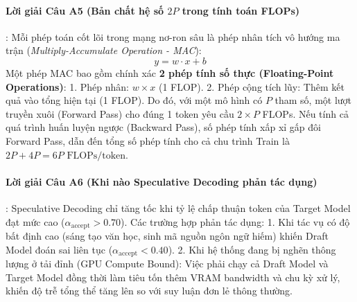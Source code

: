 \paragraph{Lời giải Câu A5 (Bản chất hệ số $2P$ trong tính toán FLOPs)}:
Mỗi phép toán cốt lõi trong mạng nơ-ron sâu là phép nhân tích vô hướng ma trận (\textit{Multiply-Accumulate Operation - MAC}):
\begin{equation*}
y = w \cdot x + b
\end{equation*}
Một phép MAC bao gồm chính xác \textbf{2 phép tính số thực (Floating-Point Operations)}:
1. Phép nhân: $w \times x$ (1 FLOP).
2. Phép cộng tích lũy: Thêm kết quả vào tổng hiện tại (1 FLOP).
Do đó, với một mô hình có $P$ tham số, một lượt truyền xuôi (Forward Pass) cho đúng 1 token yêu cầu $2 \times P$ FLOPs. Nếu tính cả quá trình huấn luyện ngược (Backward Pass), số phép tính xấp xỉ gấp đôi Forward Pass, dẫn đến tổng số phép tính cho cả chu trình Train là $2P + 4P = 6P\text{ FLOPs/token}$.

\paragraph{Lời giải Câu A6 (Khi nào Speculative Decoding phản tác dụng)}:
Speculative Decoding chỉ tăng tốc khi tỷ lệ chấp thuận token của Target Model đạt mức cao ($\alpha_{\text{accept}} > 0.70$).
Các trường hợp phản tác dụng:
1. Khi tác vụ có độ bất định cao (sáng tạo văn học, sinh mã nguồn ngôn ngữ hiếm) khiến Draft Model đoán sai liên tục ($\alpha_{\text{accept}} < 0.40$).
2. Khi hệ thống đang bị nghẽn thông lượng ở tải đỉnh (GPU Compute Bound): Việc phải chạy cả Draft Model và Target Model đồng thời làm tiêu tốn thêm VRAM bandwidth và chu kỳ xử lý, khiến độ trễ tổng thể tăng lên so với suy luận đơn lẻ thông thường.


